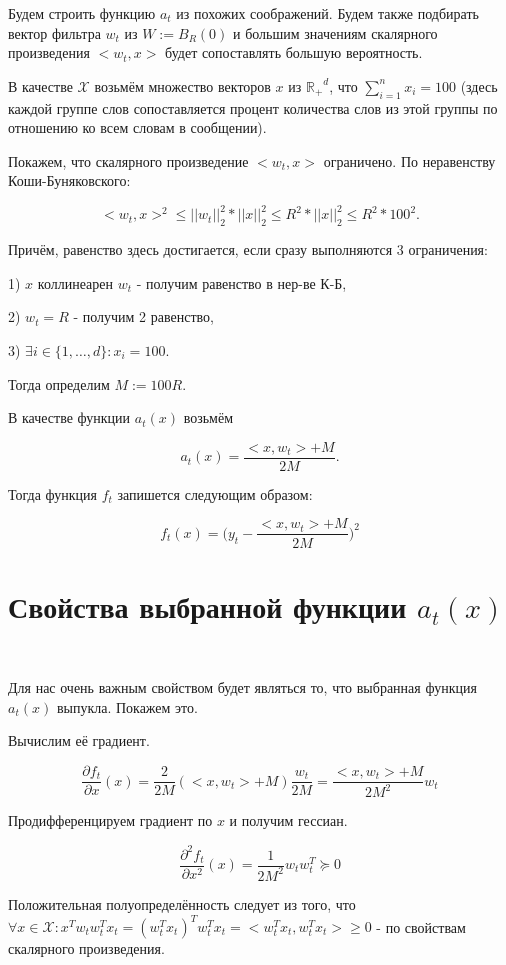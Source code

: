 \documentclass[12pt]{article}
\begin{document}
Будем строить функцию $a_t$ из похожих соображений. Будем также подбирать вектор фильтра $w_t$ из $W := B_R(0)$ и большим значениям скалярного произведения $<w_t, x>$ будет сопоставлять большую вероятность.

В качестве $\mathcal{X}$ возьмём множество векторов $x$ из $\mathbb{R_{+}}^d$, что $\sum\limits_{i=1}^n x_i = 100$ (здесь каждой группе слов сопоставляется процент количества слов из этой группы по отношению ко всем словам в сообщении).

Покажем, что скалярного произведение $<w_t, x>$ ограничено. По неравенству Коши-Буняковского:

$$<w_t, x>^2 \leq ||w_t||_2^2*||x||_2^2 \leq R^2*||x||_2^2 \leq R^2*100^2.$$

Причём, равенство здесь достигается, если сразу выполняются 3 ограничения:

1) $x$ коллинеарен $w_t$ - получим равенство в нер-ве К-Б,

2) $w_t=R$ - получим 2 равенство,

3) $\exists i \in \{1, \dots, d\}: x_i = 100$.

Тогда определим $M := 100R$.

В качестве функции $a_t(x)$ возьмём

 $$a_t(x) = \frac{<x, w_t>+M}{2M}.$$
 
 Тогда функция $f_t$ запишется следующим образом:
 
 $$f_t(x) = \bigg(y_t - \frac{<x, w_t>+M}{2M}\bigg)^2$$
 
\section*{Свойства выбранной функции $a_t(x)$}
$ $

Для нас очень важным свойством будет являться то, что выбранная функция $a_t(x)$ выпукла. Покажем это.

Вычислим её градиент.

$$\frac{\partial f_t}{\partial x}(x) = \frac{2}{2M}(<x, w_t>+M)\frac{w_t}{2M} = \frac{<x, w_t>+M}{2M^2}w_t$$

Продифференцируем градиент по $x$ и получим гессиан.

$$\frac{\partial^2 f_t}{\partial x^2}(x) = \frac{1}{2M^2}w_tw_t^T \succeq 0$$

Положительная полуопределённость следует из того, что $\forall x \in \mathcal{X}: x^Tw_tw_t^Tx_t = (w_t^Tx_t)^Tw_t^Tx_t = <w_t^Tx_t, w_t^Tx_t> \geq 0$ - по свойствам скалярного произведения.
\end{document}
